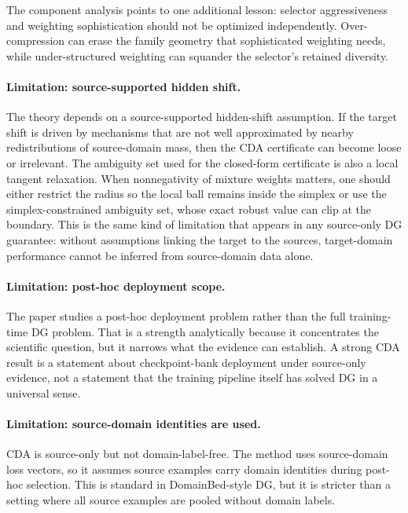 \documentclass{article}
\newif\ifsubmissionmode
\newcommand{\placeholderguard}[1]{%
  \ifsubmissionmode
    \PackageError{cda_final_v2}{Provisional red content remains in submission mode}{Remove all provisional red content before building in submission mode.}%
  \else
    {\color{red!70!black}#1}%
  \fi
}
\newcommand{\prov}[1]{\placeholderguard{#1}}
\theoremstyle{definition}
\begin{document}
\prov{The component analysis points to one additional lesson: selector aggressiveness and weighting sophistication should not be optimized independently. Over-compression can erase the family geometry that sophisticated weighting needs, while under-structured weighting can squander the selector's retained diversity.}

\paragraph{Limitation: source-supported hidden shift.}
The theory depends on a source-supported hidden-shift assumption. If the target shift is driven by mechanisms that are not well approximated by nearby redistributions of source-domain mass, then the CDA certificate can become loose or irrelevant. The ambiguity set used for the closed-form certificate is also a local tangent relaxation. When nonnegativity of mixture weights matters, one should either restrict the radius so the local ball remains inside the simplex or use the simplex-constrained ambiguity set, whose exact robust value can clip at the boundary. This is the same kind of limitation that appears in any source-only DG guarantee: without assumptions linking the target to the sources, target-domain performance cannot be inferred from source-domain data alone.

\paragraph{Limitation: post-hoc deployment scope.}
The paper studies a post-hoc deployment problem rather than the full training-time DG problem. That is a strength analytically because it concentrates the scientific question, but it narrows what the evidence can establish. A strong CDA result is a statement about checkpoint-bank deployment under source-only evidence, not a statement that the training pipeline itself has solved DG in a universal sense.

\paragraph{Limitation: source-domain identities are used.}
CDA is source-only but not domain-label-free. The method uses source-domain loss vectors, so it assumes source examples carry domain identities during post-hoc selection. This is standard in DomainBed-style DG, but it is stricter than a setting where all source examples are pooled without domain labels.
\end{document}
